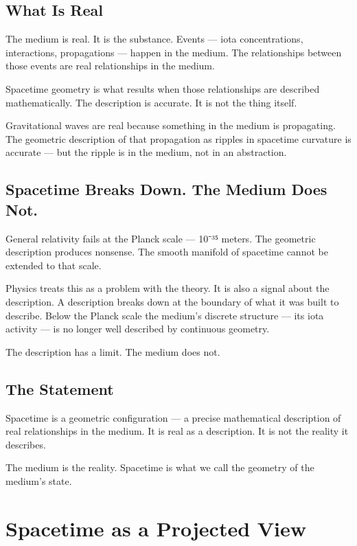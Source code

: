 \documentclass[11pt]{article}
\begin{document}
\subsection{What Is Real}
\label{sec:orgf373cd2}

The medium is real. It is the substance. Events — iota concentrations,
interactions, propagations — happen in the medium. The relationships between
those events are real relationships in the medium.

Spacetime geometry is what results when those relationships are described
mathematically. The description is accurate. It is not the thing itself.

Gravitational waves are real because something in the medium is propagating. The
geometric description of that propagation as ripples in spacetime curvature is
accurate — but the ripple is in the medium, not in an abstraction.

\subsection{Spacetime Breaks Down. The Medium Does Not.}
\label{sec:org783200b}

General relativity fails at the Planck scale — 10⁻³⁵ meters. The geometric
description produces nonsense. The smooth manifold of spacetime cannot be
extended to that scale.

Physics treats this as a problem with the theory. It is also a signal about the
description. A description breaks down at the boundary of what it was built to
describe. Below the Planck scale the medium's discrete structure — its iota
activity — is no longer well described by continuous geometry.

The description has a limit. The medium does not.

\subsection{The Statement}
\label{sec:org0b9ec07}

Spacetime is a geometric configuration — a precise mathematical description of
real relationships in the medium. It is real as a description. It is not the
reality it describes.

The medium is the reality. Spacetime is what we call the geometry of the
medium's state.

\section{Spacetime as a Projected View}
\label{sec:org4df8848}
\end{document}
